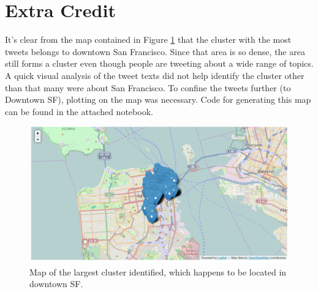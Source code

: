 \documentclass[12pt]{article}
\begin{document}
\section{Extra Credit}
It's clear from the map contained in Figure \ref{map} that the cluster with the most tweets belongs to downtown San Francisco. Since that area is so dense, the area still forms a cluster even though people are tweeting about a wide range of topics. A quick visual analysis of the tweet texts did not help identify the cluster other than that many were about San Francisco. To confine the tweets further (to Downtown SF), plotting on the map was necessary. Code for generating this map can be found in the attached notebook.
	\begin{figure}[h]
		\centering
		\includegraphics[width=6in]{map}
		\caption{Map of the largest cluster identified, which happens to be located in downtown SF.} \label{map}
	\end{figure}
\end{document}
